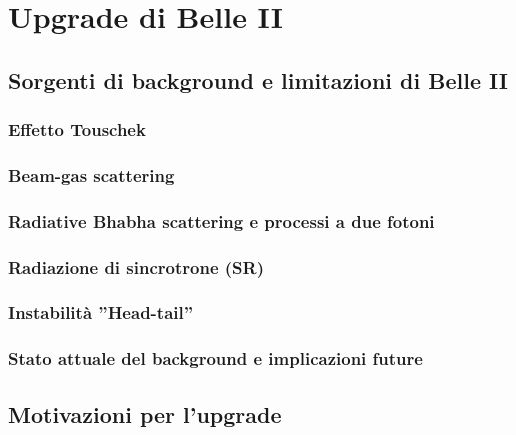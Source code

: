 \chapter{Upgrade di Belle II}

\section{Sorgenti di background e limitazioni di Belle II}

\subsection{Effetto Touschek}

\subsection{Beam-gas scattering}

\subsection{Radiative Bhabha scattering e processi a due fotoni}

\subsection{Radiazione di sincrotrone (SR)}

\subsection{Instabilità ''Head-tail''}

\subsection{Stato attuale del background e implicazioni future}


\section{Motivazioni per l'upgrade}

